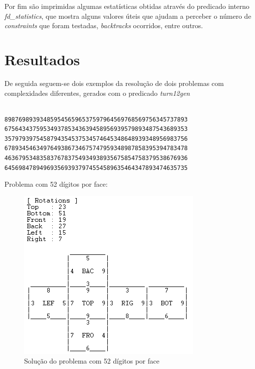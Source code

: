 Por fim são imprimidas algumas estatísticas obtidas através do predicado interno \textit{fd\_statistics}, que mostra alguns valores úteis que ajudam a perceber o número de \textit{constraints} que foram testadas, \textit{backtracks} ocorridos, entre outros.



\section{Resultados}
\label{rest:6}

De seguida seguem-se dois exemplos da resolução de dois problemas com complexidades diferentes, gerados com o predicado \textit{turn12gen}

\begin{f_exemplo}[H]
\begin{verbatim}

8987698939348595456596537597964569768569756345737893
6756434375953493785343639458956939579893487543689353
3579793975458794354537534574645348648939348956983756
6789345463497649386734675747959348987858395394783478
4636795348358376783754934938935675854758379538676936
6456984789496935693937974554589635464347893474635735
\end{verbatim}
\caption{Problema com 52 dígitos por face:}
\end{f_exemplo}

\begin{figure}[H]
\begin{center}
\includegraphics[scale=0.7]{ex1.png}
\caption{Solução do problema com 52 dígitos por face}
\label{fig:4}
\end{center}
\end{figure}

